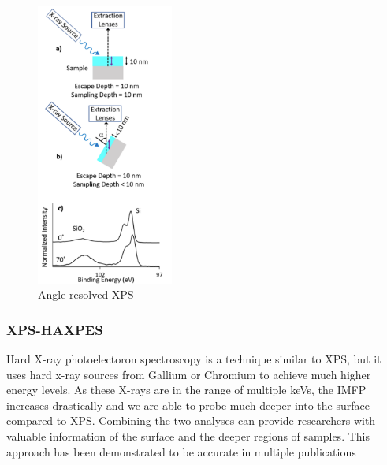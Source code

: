 \begin{figure}
    \centering
    \includegraphics[width=0.4\textwidth]{Figures/ARXPS.png}
    \caption{Angle resolved XPS \cite{stevie_introduction_2020}}
    \label{fig:arxps}
\end{figure}


\subsubsection{XPS-HAXPES}

Hard X-ray photoelectoron spectroscopy is a technique similar to XPS, but it uses hard x-ray sources from Gallium or Chromium to achieve much higher energy levels. As these X-rays are in the range of multiple keVs, the IMFP increases drastically and we are able to probe much deeper into the surface compared to XPS. Combining the two analyses can provide researchers with valuable information of the surface and the deeper regions of samples. This approach has been demonstrated to be accurate in multiple publications \cite{bure_assessing_2023, siol_concepts_2020} 